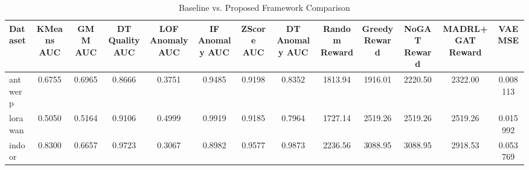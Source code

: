 \begin{table}[h]
\centering
\caption{Baseline vs. Proposed Framework Comparison}
\label{tab:results}
\begin{tabular}{lcccccccccccc}
\hline
Dataset & KMeans AUC & GMM AUC & DT Quality AUC & LOF Anomaly AUC & IF Anomaly AUC & ZScore AUC & DT Anomaly AUC & Random Reward & Greedy Reward & NoGAT Reward & MADRL+GAT Reward & VAE MSE \\
\hline
antwerp & 0.6755 & 0.6965 & 0.8666 & 0.3751 & 0.9485 & 0.9198 & 0.8352 & 1813.94 & 1916.01 & 2220.50 & 2322.00 & 0.008113 \\
lorawan & 0.5050 & 0.5164 & 0.9106 & 0.4999 & 0.9919 & 0.9185 & 0.7964 & 1727.14 & 2519.26 & 2519.26 & 2519.26 & 0.015992 \\
indoor & 0.8300 & 0.6657 & 0.9723 & 0.3067 & 0.8982 & 0.9577 & 0.9873 & 2236.56 & 3088.95 & 3088.95 & 2918.53 & 0.053769 \\
\hline
\end{tabular}
\end{table}
